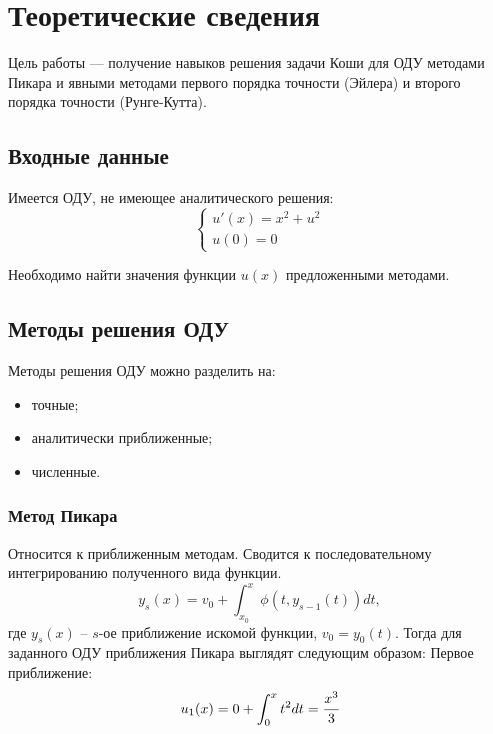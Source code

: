 \chapter{Теоретические сведения}

Цель работы --- получение навыков решения задачи Коши для ОДУ методами Пикара и явными методами первого порядка точности (Эйлера) и второго порядка точности (Рунге-Кутта).

\section{Входные данные}
Имеется ОДУ, не имеющее аналитического решения:
\begin{equation}
	\begin{cases}
		u'(x) = x^2 + u^2 \\
		u(0) = 0
	\end{cases}
\end{equation}

Необходимо найти значения функции $u(x)$ предложенными методами.

\section{Методы решения ОДУ}

Методы решения ОДУ можно разделить на:
\begin{itemize}
	\item точные;
	\item аналитически приближенные;
	\item численные.
\end{itemize} 
\subsection{Метод Пикара}
Относится к приближенным методам. Сводится к последовательному интегрированию полученного вида функции.
\begin{equation}
	y_s(x) = v_0 + \int_{x_0}^{x}\phi(t, y_{s -1}(t))dt, 
\end{equation}
где $y_s(x)$ – $s$-ое приближение искомой функции, $v_0 = y_0(t)$.
Тогда для заданного ОДУ приближения Пикара выглядят следующим образом:
Первое приближение:
\begin{equation}
	u_1(x) = 0 + \int_{0}^{x}t^2dt = \cfrac{x^3}{3}
\end{equation}

